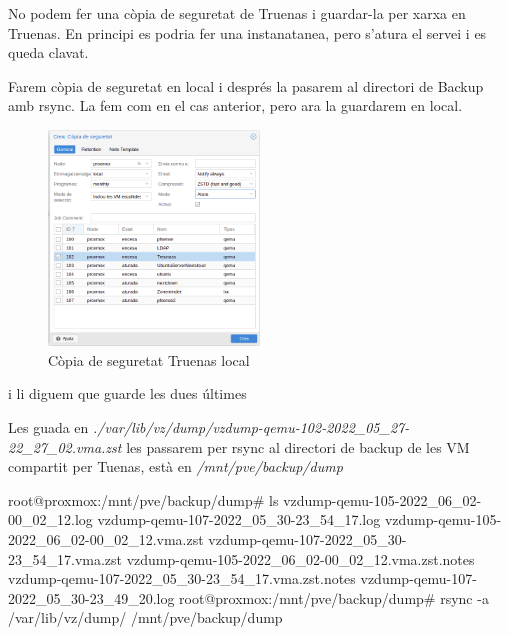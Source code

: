 \documentclass[
  10pt,
]{krantz}
\newenvironment{Shaded}{\begin{snugshade}}{\end{snugshade}}
\newcommand{\AttributeTok}[1]{\textcolor[rgb]{0.77,0.63,0.00}{#1}}
\newcommand{\ExtensionTok}[1]{#1}
\newcommand{\NormalTok}[1]{#1}
\begin{document}
No podem fer una còpia de seguretat de Truenas i guardar-la per xarxa en Truenas. En principi es podria fer una instanatanea, pero s'atura el servei i es queda clavat.

Farem còpia de seguretat en local i després la pasarem al directori de Backup amb rsync. La fem com en el cas anterior, pero ara la guardarem en local.

\begin{figure}
\centering
\includegraphics[width=0.5\textwidth,height=\textheight]{imatges/proxmox/copia_seguretat_Truenas_local.png}
\caption{Còpia de seguretat Truenas local}
\end{figure}

i li diguem que guarde les dues últimes

Les guada en \emph{./var/lib/vz/dump/vzdump-qemu-102-2022\_05\_27-22\_27\_02.vma.zst} les passarem per rsync al directori de backup de les VM compartit per Tuenas, està en \emph{/mnt/pve/backup/dump}

\begin{Shaded}
\begin{Highlighting}[]
\ExtensionTok{root@proxmox:/mnt/pve/backup/dump\#}\NormalTok{ ls}
\ExtensionTok{vzdump{-}qemu{-}105{-}2022\_06\_02{-}00\_02\_12.log}
\ExtensionTok{vzdump{-}qemu{-}107{-}2022\_05\_30{-}23\_54\_17.log}
\ExtensionTok{vzdump{-}qemu{-}105{-}2022\_06\_02{-}00\_02\_12.vma.zst}
\ExtensionTok{vzdump{-}qemu{-}107{-}2022\_05\_30{-}23\_54\_17.vma.zst}
\ExtensionTok{vzdump{-}qemu{-}105{-}2022\_06\_02{-}00\_02\_12.vma.zst.notes}
\ExtensionTok{vzdump{-}qemu{-}107{-}2022\_05\_30{-}23\_54\_17.vma.zst.notes}
\ExtensionTok{vzdump{-}qemu{-}107{-}2022\_05\_30{-}23\_49\_20.log}
\ExtensionTok{root@proxmox:/mnt/pve/backup/dump\#}\NormalTok{ rsync }\AttributeTok{{-}a}\NormalTok{ /var/lib/vz/dump/ /mnt/pve/backup/dump}
\end{Highlighting}
\end{Shaded}
\end{document}
